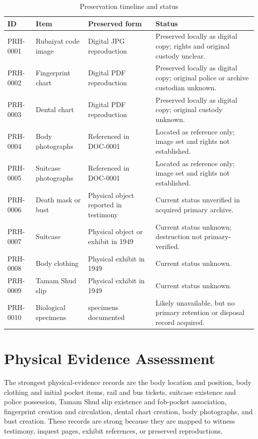\begin{table}[htbp]
\centering
\caption{Preservation timeline and status}
\label{tab:preservation-timeline-ch6}
\begin{tabularx}{\textwidth}{>{\raggedright\arraybackslash}p{}>{\raggedright\arraybackslash}p{}>{\raggedright\arraybackslash}p{}>{\raggedright\arraybackslash}X}
\toprule
ID & Item & Preserved form & Status \\
\midrule
PRH-0001 & Rubaiyat code image & Digital JPG reproduction & Preserved locally as digital copy; rights and original custody unclear. \\
PRH-0002 & Fingerprint chart & Digital PDF reproduction & Preserved locally as digital copy; original police or archive custodian unknown. \\
PRH-0003 & Dental chart & Digital PDF reproduction & Preserved locally as digital copy; original custody unknown. \\
PRH-0004 & Body photographs & Referenced in DOC-0001 & Located as reference only; image set and rights not established. \\
PRH-0005 & Suitcase photographs & Referenced in DOC-0001 & Located as reference only; image set and rights not established. \\
PRH-0006 & Death mask or bust & Physical object reported in testimony & Current status unverified in acquired primary archive. \\
PRH-0007 & Suitcase & Physical object or exhibit in 1949 & Current status unknown; destruction not primary-verified. \\
PRH-0008 & Body clothing & Physical exhibit in 1949 & Current status unknown. \\
PRH-0009 & Tamam Shud slip & Physical exhibit in 1949 & Current status unknown. \\
PRH-0010 & Biological specimens & 1948 specimens documented & Likely unavailable, but no primary retention or disposal record acquired. \\
\bottomrule
\end{tabularx}
\end{table}

\section{Physical Evidence Assessment}

The strongest physical-evidence records are the body location and position, body clothing and initial pocket items, rail and bus tickets, suitcase existence and police possession, Tamam Shud slip existence and fob-pocket association, fingerprint creation and circulation, dental chart creation, body photographs, and bust creation. These records are strong because they are mapped to witness testimony, inquest pages, exhibit references, or preserved reproductions.

